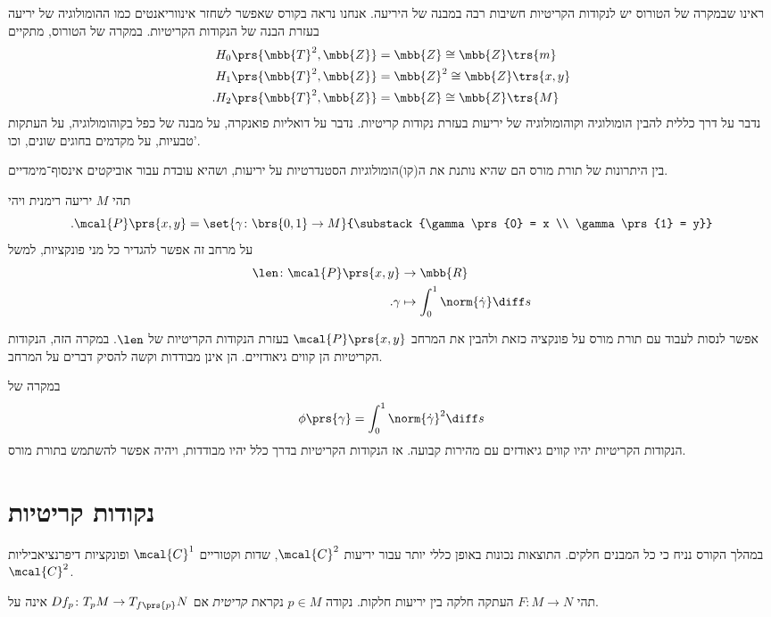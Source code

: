 \documentclass[a4paper,10pt,twoside,openany]{book}
\begin{document}
ראינו שבמקרה של הטורוס יש לנקודות הקריטיות חשיבות רבה במבנה של היריעה. אנחנו נראה בקורס שאפשר לשחזר אינווריאנטים כמו ההומולוגיה של יריעה בעזרת הבנה של הנקודות הקריטיות.
במקרה של הטורוס, מתקיים
\begin{align*}
H_0\prs{\mbb{T}^2, \mbb{Z}} &= \mbb{Z} \cong \mbb{Z}\trs{m} \\
H_1\prs{\mbb{T}^2, \mbb{Z}} &= \mbb{Z}^2 \cong \mbb{Z}\trs{x,y} \\
\text{.} H_2\prs{\mbb{T}^2, \mbb{Z}} &= \mbb{Z} \cong \mbb{Z}\trs{M}
\end{align*}
נדבר על דרך כללית להבין הומולוגיה וקוהומולוגיה של יריעות בעזרת נקודות קריטיות. נדבר על דואליות פואנקרה, על מבנה של כפל בקוהומולוגיה, על העתקות טבעיות, על מקדמים בחוגים שונים, וכו'.

בין היתרונות של תורת מורס הם שהיא נותנת את ה(קו)הומולוגיות הסטנדרטיות על יריעות, ושהיא עובדת עבור אוביקטים אינסוף־מימדיים.

\begin{example}
תהי
$M$
יריעה רימנית ויהי
\[\text{.} \mcal{P}\prs{x,y} = \set{\gamma \colon \brs{0,1} \to M}{\substack{\gamma\prs{0} = x \\ \gamma\prs{1} = y}}\]
על מרחב זה אפשר להגדיר כל מני פונקציות, למשל
\begin{align*}
\len \colon \mcal{P}\prs{x,y} &\to \mbb{R} \\
\text{.} \gamma &\mapsto \int_0^1 \norm{\dot{\gamma}} \diff s
\end{align*}

אפשר לנסות לעבוד עם תורת מורס על פונקציה כזאת ולהבין את המרחב
$\mcal{P}\prs{x,y}$
בעזרת הנקודות הקריטיות של
$\len$.
במקרה הזה, הנקודות הקריטיות הן קווים גיאודזיים. הן אינן מבודדות וקשה להסיק דברים על המרחב.

במקרה של
\[ \phi\prs{\gamma} = \int_0^1 \norm{\dot{\gamma}}^2 \diff s\]
הנקודות הקריטיות יהיו קווים גיאודזים עם מהירות קבועה. אז הנקודות הקריטיות בדרך כלל יהיו מבודדות, ויהיה אפשר להשתמש בתורת מורס.
\end{example}

\section{נקודות קריטיות}

במהלך הקורס נניח כי כל המבנים חלקים.
התוצאות נכונות באופן כללי יותר עבור יריעות
$\mcal{C}^2$,
שדות וקטוריים
$\mcal{C}^1$
ופונקציות דיפרנציאביליות
$\mcal{C}^2$.

\begin{definition}
תהי
$F \colon M \to N$
העתקה חלקה בין יריעות חלקות.
נקודה
$p \in M$
נקראת
\emph{קריטית}
אם
$D f_p \colon T_p M \to T_{f\prs{p}} N$
אינה על.
\end{definition}
\end{document}
